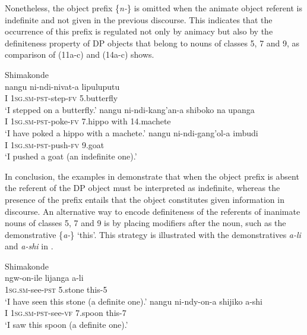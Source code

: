 \documentclass[output=paper]{langsci/langscibook}
\begin{document}
Nonetheless, the object prefix \{{\textit{n-}}\} is omitted when the animate object referent is indefinite and not given in the previous discourse. This indicates that the occurrence of this prefix is regulated not only by animacy but also by the definiteness property of DP objects that belong to nouns of classes 5, 7 and 9, as comparison of (11a-c) and (14a-c) shows.


\ea\label{ex:nguna:14} {Shimakonde}\\
\ea
\gll nangu        ni-ndi-nivat-a                 lipuluputu\\
     I                \textsc{1sg.sm-pst}-step-\textsc{fv}        5.butterfly\\
\glt ‘I stepped on a butterfly.’
\ex\label{ex:nguna:14b}
\gll nangu        ni-ndi-kang'an-a             shiboko           na       upanga\\
     I                \textsc{1sg.sm-pst}-poke-\textsc{fv}       7.hippo            with   14.machete\\
\glt ‘I have poked a hippo with a machete.’
\ex\label{ex:nguna:14c}
\gll nangu        ni-ndi-gang'ol-a             imbudi\\
     I                \textsc{1sg.sm-pst}-push-\textsc{fv}       9.goat\\
\glt ‘I pushed a goat (an indefinite one).’
\z
\z

{In conclusion, the examples in } {demonstrate that when the object prefix is absent the referent of the DP object must be interpreted as indefinite, whereas the presence of the prefix entails that the object constitutes given information in discourse. }{An alternative way to encode definiteness of the referents of inanimate nouns of classes 5, 7 and 9 is by placing modifiers after the noun, such as the demonstrative \{}{\textit{a-}}{\}} {\textit {}}{‘this’. This strategy is illustrated with the demonstratives }{\textit{a-li }}{and} {\textit {a-shi}} {in }.


\ea\label{ex:nguna:15} {Shimakonde}\\
\ea
\gll ngw-on-ile               lijanga        a-li\\
     \textsc{1sg.sm}-see-\textsc{pst}       5.stone        this-5\\
\glt ‘I have seen this stone (a definite one).’
\ex\label{ex:nguna:15b}
\gll nangu      ni-ndy-on-a                shijiko         a-shi\\
     I              \textsc{1sg.sm-pst}-see-\textsc{vf }     7.spoon       this-7\\
\glt ‘I saw this spoon (a definite one).’
\z
\z
\end{document}
